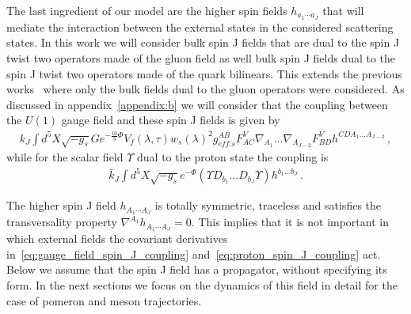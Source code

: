 \documentclass[a4paper,12pt]{article}
\begin{document}
The last ingredient of our model are the higher spin fields $h_{a_1 \cdots a_J}$ that will mediate the interaction between the external states in the considered scattering states. In this work we will consider bulk spin J fields that are dual to the spin J twist two operators made of the gluon field as well bulk spin J fields dual to the spin J twist two operators made of the quark bilinears. This extends the previous works~\cite{Ballon-Bayona:2015wra, ballon_bayona_unity_2017, Amorim:2018yod} where only the bulk fields dual to the gluon operators were considered. As discussed in appendix~\ref{appendix:b} we will consider that the coupling between the $U(1)$ gauge field and these spin J fields is given by
\begin{align}
k_J \int d^5X \sqrt{-g_s} G e^{-\frac{10}{3} \Phi} V_f \left( \lambda, \tau \right) {w_s\left(\lambda \right)}^2  g_{eff. s}^{AB} F^V_{A C} \nabla_{A_1} \dots \nabla_{A_{J-2}} F^V_{B D} h^{C D A_1 \dots A_{J-2}} \, ,
\label{eq:gauge_field_spin_J_coupling}
\end{align}
while for the scalar field $\Upsilon$ dual to the proton state the coupling is
\begin{align}
\bar{k}_J \int d^5 X \sqrt{-g_s} e^{-\Phi} \left( \Upsilon D_{b_1} \dots D_{b_J} \Upsilon \right) h^{b_1 \dots b_J} \, .
\label{eq:proton_spin_J_coupling}
\end{align}

The higher spin J field $h_{A_1 \cdots A_J}$ is totally symmetric, traceless and satisfies the transversality property $\nabla^{A_1} h_{A_1 \cdots A_J} = 0$. This implies that it is not important in which external fields the covariant derivatives in~\ref{eq:gauge_field_spin_J_coupling} and~\ref{eq:proton_spin_J_coupling} act. 
Below we assume that the spin J field has a propagator, without specifying its form. In the next sections we focus on the dynamics of this field in detail for the case of pomeron and meson trajectories.
\end{document}
